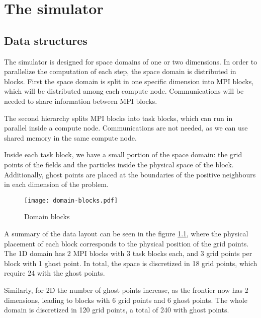 \chapter{The simulator}


\section{Data structures}

The simulator is designed for space domains of one or two dimensions. In order 
to parallelize the computation of each step, the space domain is distributed in 
blocks. First the space domain is split in one specific dimension into MPI 
blocks, which will be distributed among each compute node. Communications will 
be needed to share information between MPI blocks.

The second hierarchy splits MPI blocks into task blocks, which can run in 
parallel inside a compute node. Communications are not needed, as we can use 
shared memory in the same compute node.

Inside each task block, we have a small portion of the space domain: the grid 
points of the fields and the particles inside the physical space of the block.  
Additionally, ghost points are placed at the boundaries of the positive 
neighbours in each dimension of the problem.


\begin{figure}[h]
	\centering
	\texttt{[image: domain-blocks.pdf]}
	\caption{Domain blocks}
	\label{fig:domain-blocks}
\end{figure}

A summary of the data layout can be seen in the figure \ref{fig:domain-blocks}, 
where the physical placement of each block corresponds to the physical position 
of the grid points. The 1D domain has 2 MPI blocks with 3 task blocks each, and 
3 grid points per block with 1 ghost point. In total, the space is discretized 
	in 18 grid points, which require 24 with the ghost points.

Similarly, for 2D the number of ghost points increase, as the frontier now has 2 
dimensions, leading to blocks with 6 grid points and 6 ghost points. The whole 
domain is discretized in 120 grid points, a total of 240 with ghost points.

